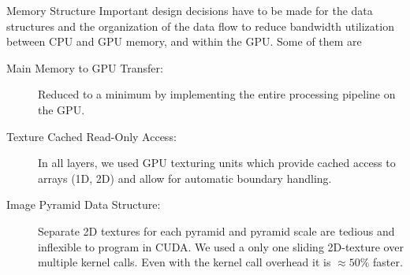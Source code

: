 \documentclass[final]{beamer}
\begin{document}
\begin{frame}{}
\begin{columns}[t]
      \begin{column}{.48\linewidth}
        \begin{block}{Memory Structure}
          Important design decisions have to be made for the data structures and
the organization of the data flow to reduce bandwidth utilization
between CPU and GPU memory, and within the GPU. Some of them are
\begin{description}
\item[ Main Memory to GPU Transfer: ] 
Reduced to a minimum by implementing the entire processing pipeline on the GPU.\\
\item[ Texture Cached Read-Only Access:]
In all layers, we used GPU texturing units which provide cached access to arrays (1D, 2D) and allow for automatic boundary handling.
\item [ Image Pyramid Data Structure:]
Separate 2D textures for each pyramid and pyramid scale are tedious and inflexible to program in CUDA.
We used a only one sliding 2D-texture over multiple kernel calls. Even with the kernel call overhead it is $\approx 50\%$ faster.
\newline
\end{description}
        \end{block}
				



\end{column}
\end{columns}
\end{frame}
\end{document}
